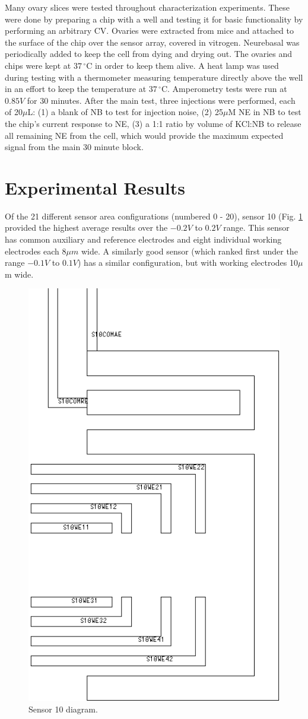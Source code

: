 \documentclass{article}
\begin{document}
Many ovary slices were tested throughout characterization experiments. These were done by preparing a chip with a well and testing it for basic functionality by performing an arbitrary CV. Ovaries were extracted from mice and attached to the surface of the chip over the sensor array, covered in vitrogen. Neurebasal was periodically added to keep the cell from dying and drying out. The ovaries and chips were kept at $37\,^{\circ}\mathrm{C}$ in order to keep them alive. A heat lamp was used during testing with a thermometer measuring temperature directly above the well in an effort to keep the temperature at $37\,^{\circ}\mathrm{C}$. Amperometry tests were run at $0.85V$ for 30 minutes. After the main test, three injections were performed, each of 20$\mu$L: (1) a blank of NB to test for injection noise, (2) 25$\mu$M NE in NB to test the chip's current response to NE, (3) a 1:1 ratio by volume of KCl:NB to release all remaining NE from the cell, which would provide the maximum expected signal from the main 30 minute block.

\section{Experimental Results}

Of the 21 different sensor area configurations (numbered 0 - 20), sensor 10 (Fig. \ref{sensor-10} provided the highest average results over the $-0.2V$ to $0.2V$ range. This sensor has common auxiliary and reference electrodes and eight individual working electrodes each $8\mu m$ wide. A similarly good sensor (which ranked first under the range $-0.1V$ to $0.1V$) has a similar configuration, but with working electrodes 10$\mu$m wide.

\begin{figure}
\centering
\includegraphics[height=\linewidth]{figures/s10.png}
\caption{Sensor 10 diagram.}
\label{sensor-10}
\end{figure}
\end{document}
